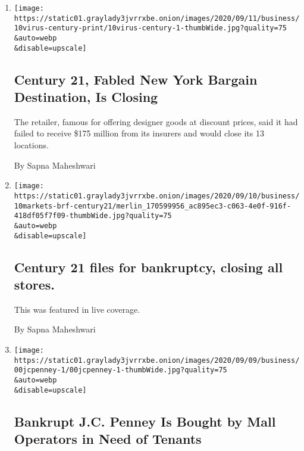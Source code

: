 \begin{enumerate}
\def\labelenumi{\arabic{enumi}.}
\item
  \href{/2020/09/10/business/century-21-bankruptcy-closing.html}{}

  \texttt{[image: https://static01.graylady3jvrrxbe.onion/images/2020/09/11/business/10virus-century-print/10virus-century-1-thumbWide.jpg?quality=75\\\&auto=webp\\\&disable=upscale]}

  \hypertarget{century-21-fabled-new-york-bargain-destination-is-closing}{%
  \subsection{Century 21, Fabled New York Bargain Destination, Is
  Closing}\label{century-21-fabled-new-york-bargain-destination-is-closing}}

  The retailer, famous for offering designer goods at discount prices,
  said it had failed to receive \$175 million from its insurers and
  would close its 13 locations.

  By Sapna Maheshwari
\item
  \href{/live/2020/09/10/business/stock-market-today-coronavirus/century-21-files-for-bankruptcy-closing-all-stores}{}

  \texttt{[image: https://static01.graylady3jvrrxbe.onion/images/2020/09/10/business/10markets-brf-century21/merlin\_170599956\_ac895ec3-c063-4e0f-916f-418df05f7f09-thumbWide.jpg?quality=75\\\&auto=webp\\\&disable=upscale]}

  \hypertarget{century-21-files-for-bankruptcy-closing-all-stores}{%
  \subsection{Century 21 files for bankruptcy, closing all
  stores.}\label{century-21-files-for-bankruptcy-closing-all-stores}}

  This was featured in live coverage.

  By Sapna Maheshwari
\item
  \href{/2020/09/09/business/jc-penney-sale-simon-brookfield.html}{}

  \texttt{[image: https://static01.graylady3jvrrxbe.onion/images/2020/09/09/business/00jcpenney-1/00jcpenney-1-thumbWide.jpg?quality=75\\\&auto=webp\\\&disable=upscale]}

  \hypertarget{bankrupt-jc-penney-is-bought-by-mall-operators-in-need-of-tenants}{%
  \subsection{Bankrupt J.C. Penney Is Bought by Mall Operators in Need
  of
  Tenants}\label{bankrupt-jc-penney-is-bought-by-mall-operators-in-need-of-tenants}}


\end{enumerate}
